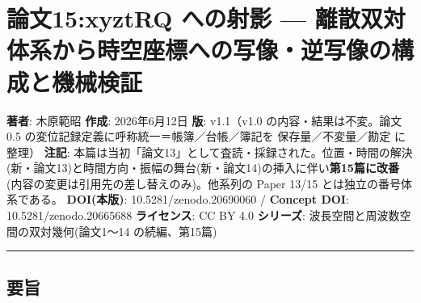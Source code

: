 \documentclass[
]{ltjsarticle}
\author{}
\date{}
\begin{document}
\section{論文15:xyztRQ への射影 ---
離散双対体系から時空座標への写像・逆写像の構成と機械検証}\label{ux8ad6ux658715xyztrq-ux3078ux306eux5c04ux5f71-ux96e2ux6563ux53ccux5bfeux4f53ux7cfbux304bux3089ux6642ux7a7aux5ea7ux6a19ux3078ux306eux5199ux50cfux9006ux5199ux50cfux306eux69cbux6210ux3068ux6a5fux68b0ux691cux8a3c}

\textbf{著者}: 木原範昭 \textbf{作成}: 2026年6月12日 \textbf{版}:
v1.1（v1.0 の内容・結果は不変。論文0.5
の変位記録定義に呼称統一＝帳簿／台帳／簿記を 保存量／不変量／勘定
に整理） \textbf{注記}:
本篇は当初「論文13」として査読・採録された。位置・時間の解決(新・論文13)と時間方向・振幅の舞台(新・論文14)の挿入に伴い\textbf{第15篇に改番}(内容の変更は引用先の差し替えのみ)。他系列の
Paper 13/15 とは独立の番号体系である。 \textbf{DOI(本版)}:
10.5281/zenodo.20690060 / \textbf{Concept DOI}: 10.5281/zenodo.20665688
\textbf{ライセンス}: CC BY 4.0 \textbf{シリーズ}:
波長空間と周波数空間の双対幾何(論文1〜14 の続編、第15篇)

\begin{center}\rule{0.5\linewidth}{0.5pt}\end{center}

\subsection{要旨}\label{ux8981ux65e8}
\end{document}
